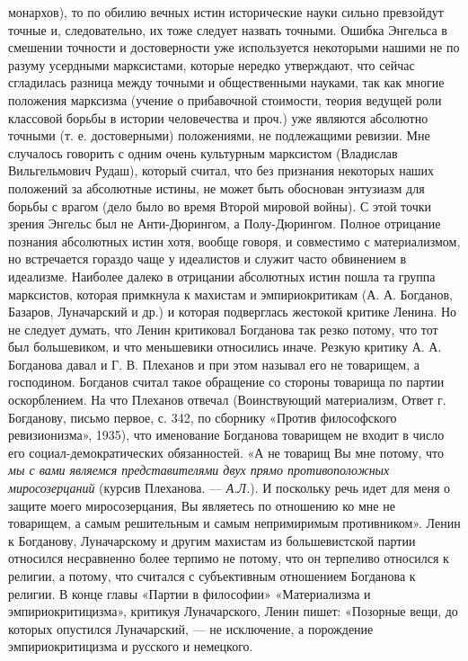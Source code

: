 монархов), то по обилию вечных истин исторические науки сильно превзойдут
точные и, следовательно, их тоже следует назвать точными. Ошибка Энгельса в
смешении точности и достоверности уже используется некоторыми нашими не по
разуму усердными марксистами, которые нередко утверждают, что сейчас сгладилась
разница между точными и общественными науками, так как многие положения
марксизма (учение о прибавочной стоимости, теория ведущей роли классовой борьбы
в истории человечества и проч.) уже являются абсолютно точными (т. е.
достоверными) положениями, не подлежащими ревизии. Мне случалось говорить с
одним очень культурным марксистом (Владислав Вильгельмович Рудаш), который
считал, что без признания некоторых наших положений за абсолютные истины, не
может быть обоснован энтузиазм для борьбы с врагом (дело было во время Второй
мировой войны). С этой точки зрения Энгельс был не Анти-Дюрингом, а
Полу-Дюрингом. Полное отрицание познания абсолютных истин хотя, вообще говоря,
и совместимо с материализмом, но встречается гораздо чаще у идеалистов и служит
часто обвинением в идеализме. Наиболее далеко в отрицании абсолютных истин
пошла та группа марксистов, которая примкнула к махистам и эмпириокритикам (А.
А. Богданов, Базаров, Луначарский и др.) и которая подверглась жестокой критике
Ленина. Но не следует думать, что Ленин критиковал Богданова так резко потому,
что тот был большевиком, и что меньшевики относились иначе. Резкую критику А.
А. Богданова давал и Г. В. Плеханов и при этом называл его не товарищем, а
господином. Богданов считал такое обращение со стороны товарища по партии
оскорблением. На что Плеханов отвечал (Воинствующий материализм, Ответ г.
Богданову, письмо первое, с. 342, по сборнику «Против философского
ревизионизма», 1935), что именование Богданова товарищем не входит в число его
социал-демократических обязанностей. «А не товарищ Вы мне потому, что \emph{мы
с вами являемся представителями двух прямо противоположных
миросозерцаний} (курсив Плеханова. --- \emph{А.Л.}). И поскольку речь идет для
меня о защите моего миросозерцания, Вы являетесь по отношению ко мне не
товарищем, а самым решительным и самым непримиримым противником». Ленин к
Богданову, Луначарскому и другим махистам из большевистской партии относился
несравненно более терпимо не потому, что он терпеливо относился к религии, а
потому, что считался с субъективным отношением Богданова к религии. В конце
главы «Партии в философии» «Материализма и эмпириокритицизма», критикуя
Луначарского, Ленин пишет: «Позорные вещи, до которых опустился Луначарский,
--- не исключение, а порождение эмпириокритицизма и русского и немецкого.
